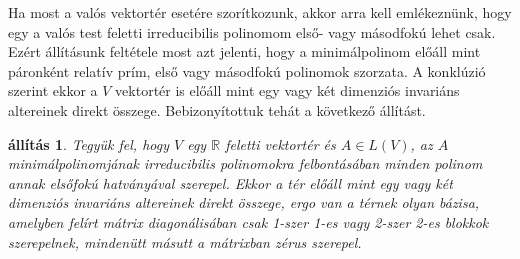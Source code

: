 \documentclass[a4paper, showtrims]{memoir}
\theoremstyle{plain}
\newtheorem{proposition}{állítás}[chapter]
\theoremstyle{remark}
\theoremstyle{definition}
\begin{document}
Ha most a valós vektortér esetére szorítkozunk, akkor arra kell emlékeznünk, hogy
egy a valós test feletti irreducibilis polinomom első- vagy másodfokú lehet csak.
Ezért állításunk feltétele most azt jelenti, 
hogy a minimálpolinom előáll mint páronként relatív prím, első vagy másodfokú polinomok szorzata.
A konklúzió szerint ekkor a $V$ vektortér is előáll mint egy vagy két dimenziós invariáns altereinek direkt összege. Bebizonyítottuk tehát a következő állítást.
\begin{proposition}
	Tegyük fel, hogy $V$ egy $\mathbb{R}$ feletti vektortér és $A\in L\left( V \right)$,
    az $A$ minimálpolinomjának irreducibilis polinomokra felbontásában minden polinom annak elsőfokú hatványával szerepel.
    Ekkor a tér előáll mint egy vagy két dimenziós invariáns altereinek direkt összege,
    ergo van a térnek olyan bázisa, amelyben felírt mátrix diagonálisában csak 1-szer 1-es vagy 2-szer 2-es blokkok szerepelnek, mindenütt másutt a mátrixban zérus szerepel.
\end{proposition}
\end{document}
